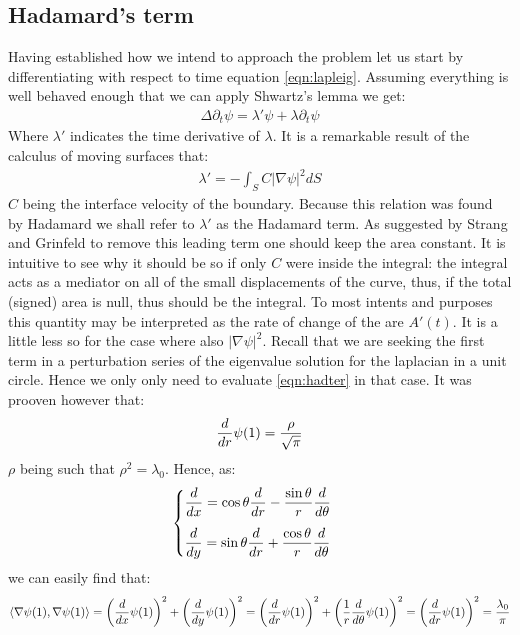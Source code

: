 \documentclass[../main.tex]{subfiles}
\begin{document}
	\subsection{Hadamard's term}
		Having established how we intend to approach the problem let us start by differentiating with respect to time equation \ref{eqn:lapleig}. Assuming everything is well behaved enough that we can apply Shwartz's lemma we get:
		\begin{gather}
			\label{eqn:hadter}
			\Delta\partial_{t}\psi=\lambda'\psi+\lambda\partial_{t}\psi
		\end{gather}
		Where $ \lambda' $ indicates the time derivative of $ \lambda $. It is a remarkable result of the calculus of moving surfaces that:
		\begin{gather}
			\lambda'=-\int_{S}C\left|\nabla\psi\right|^{2}dS
		\end{gather}
		$ C $ being the interface velocity of the boundary. Because this relation was found by Hadamard we shall refer to $ \lambda' $ as the Hadamard term. As suggested by Strang and Grinfeld to remove this leading term one should keep the area constant. It is intuitive to see why it should be so if only $ C $ were inside the integral: the integral acts as a mediator on all of the small displacements of the curve, thus, if the total (signed) area is null, thus should be the integral. To most intents and purposes this quantity may be interpreted as the rate of change of the are $ A'(t) $. It is a little less so for the case where also $ \left|\nabla\psi\right|^{2} $. Recall that we are seeking the first term in a perturbation series of the eigenvalue solution for the laplacian in a unit circle. Hence we only only need to evaluate \ref{eqn:hadter} in that case. It was prooven however that:
		\begin{gather}
		\dfrac{d}{dr}\psi(1)=\dfrac{\rho}{\sqrt{\pi}}
		\end{gather}
		$ \rho $ being such that $ \rho^{2}=\lambda_{0} $. Hence, as:
		\begin{gather}
			\begin{cases}
			\der{}{x}=\cos\theta\der{}{r}-\dfrac{\sin\theta}{r}\der{}{\theta}			\vspace{3mm}\\
			\der{}{y}=\sin\theta\der{}{r}+\dfrac{\cos\theta}{r}\der{}{\theta}
			\end{cases}
		\end{gather}
		we can easily find that:
		\begin{gather}
			\left<\nabla\psi(1),\nabla\psi(1)\right>=\left(\dfrac{d}{dx}\psi(1) \right)^{2}+\left(\dfrac{d}{dy}\psi(1) \right)^{2}=\left(\dfrac{d}{dr}\psi(1)\right)^{2}+\left(\dfrac{1}{r}\dfrac{d}{d\theta}\psi(1)\right)^{2}=\left(\dfrac{d}{dr}\psi(1)\right)^{2}=\dfrac{\lambda_{0}}{\pi}
		\end{gather}
\end{document}
